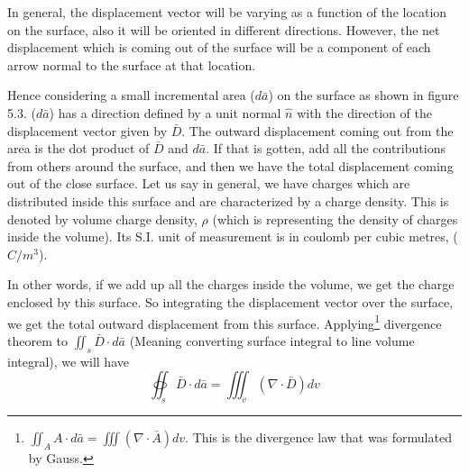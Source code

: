 In general, the displacement vector will be varying as a function of the location on the surface, also it will be oriented in different directions. However, the net displacement which is coming out of the surface will be a component of each arrow normal to the surface at that location.

Hence considering a small incremental area ($ d\bar{a} $) on the surface as shown in figure 5.3. ($ d\bar{a} $) has a direction defined by a unit normal $ \hat{n} $ with the direction of the displacement vector given by $ \bar{D} $. The outward displacement coming out from the area is the dot product of $ \bar{D} $ and $ d\bar{a} $. If that is gotten, add all the contributions from others around the surface, and then we have the total displacement coming out of the close surface. Let us say in general, we have charges which are distributed inside this surface and are characterized by a charge density. This is denoted by volume charge density, $ \rho $ (which is representing the density of charges inside the volume). Its S.I. unit of measurement is in coulomb per cubic metres, ($ C/m^{3} $).

In other words, if we add up all the charges inside the volume, we get the charge enclosed by this surface. So integrating the displacement vector over the surface, we get the total outward displacement from this surface. 
Applying\footnote[6]{
$	\iint_A A\cdot d\bar{a} = \iiint (\nabla\cdot \bar{A})dv $. This is the divergence law that was formulated by Gauss.
} divergence theorem to $\iint_s\bar{D}\cdot d\bar{a}$ (Meaning converting surface integral to line volume integral), we will have 
\begin{equation*}
\oiint_s\bar{D} \cdot d\bar{a} = \iiint_v(\nabla\cdot \bar{D})dv
\end{equation*}


